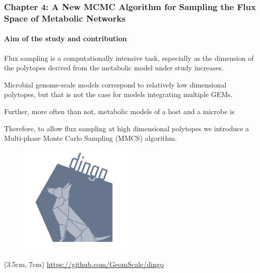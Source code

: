 \documentclass{beamer}
\begin{document}
    \begin{darkframes}
      \begin{frame}
         \frametitle{\textbf{Chapter 4}: A New MCMC Algorithm for Sampling
         the Flux Space of Metabolic Networks}
         \framesubtitle{Aim of the study and contribution}

         \small
         Flux sampling is a computationally intensive task, especially as the dimension of the 
         polytopes derived from the metabolic model under study increases. 

         Microbial genome-scale models correspond to relatively low dimensional polytopes, 
         but that is not the case for models integrating multiple GEMs. 

         Further, more often than not, metabolic models of a host and a microbe is

         Therefore, to allow flux sampling at high dimensional polytopes
         we introduce a Multi-phase Monte Carlo Sampling (MMCS) algorithm. 


      \end{frame}
   \end{darkframes}



   \begin{frame}
      
      \begin{figure}
         \includegraphics[width=55mm]{../met_nets/resources/dingo5_transparent.png}
      \end{figure}

      \begin{textblock*}{12cm}(3.5cm, 7cm)
         \href{https://github.com/GeomScale/dingo}{https://github.com/GeomScale/dingo}
      \end{textblock*}
   \end{frame}
   \fi 
\end{document}
